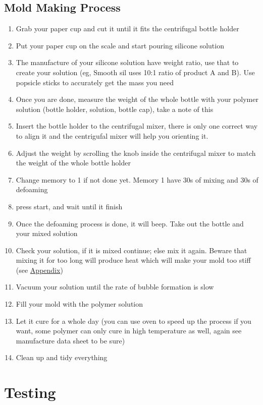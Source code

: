\documentclass{article}
\begin{document}
\subsection{Mold Making Process}
\begin{enumerate}
    \item Grab your paper cup and cut it until it fits the centrifugal bottle holder
    \item Put your paper cup on the scale and start pouring silicone solution
    \item The manufacture of your silicone solution have weight ratio, use that to create your solution (eg, Smooth sil uses 10:1 ratio of product A and B). Use popsicle sticks to accurately get the mass you need 
    \item Once you are done, measure the weight of the whole bottle with your polymer solution (bottle holder, solution, bottle cap), take a note of this
    \item Insert the bottle holder to the centrifugal mixer, there is only one correct way to align it and the centrigufal mixer will help you orienting it.
    \item Adjust the weight by scrolling the knob inside the centrifugal mixer to match the weight of the whole bottle holder
    \item Change memory to 1 if not done yet. Memory 1 have 30s of mixing and 30s of defoaming
    \item press start, and wait until it finish
    \item Once the defoaming process is done, it will beep. Take out the bottle and your mixed solution
    \item Check your solution, if it is mixed continue; else mix it again. Beware that mixing it for too long will produce heat which will make your mold too stiff (see \href{Mold_Tables}{Appendix})
    \item Vacuum your solution until the rate of bubble formation is slow
    \item Fill your mold with the polymer solution
    \item Let it cure for a whole day (you can use oven to speed up the process if you want, some polymer can only cure in high temperature as well, again see manufacture data sheet to be sure)
    \item Clean up and tidy everything
\end{enumerate}
\section{Testing}
\end{document}
